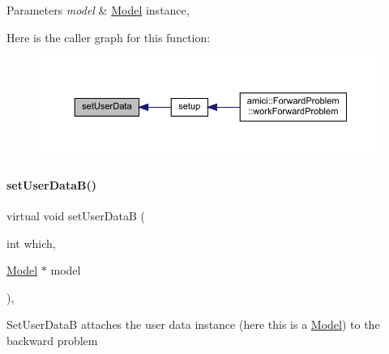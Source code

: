 \begin{DoxyParams}{Parameters}
{\em model} & \mbox{\hyperlink{classamici_1_1_model}{Model}} instance, \\
\hline
\end{DoxyParams}
Here is the caller graph for this function\+:
\nopagebreak
\begin{figure}[H]
\begin{center}
\leavevmode
\includegraphics[width=350pt]{classamici_1_1_solver_ac1ca4675503688acf946f6530fb12c10_icgraph}
\end{center}
\end{figure}
\mbox{\label{classamici_1_1_solver_ac5c347a985fa73861a88e76c7b9904f8}} 
\paragraph{\texorpdfstring{set\+User\+Data\+B()}{setUserDataB()}}
{\footnotesize\ttfamily virtual void set\+User\+DataB (\begin{DoxyParamCaption}\item[{int}]{which,  }\item[{\mbox{\hyperlink{classamici_1_1_model}{Model}} $\ast$}]{model }\end{DoxyParamCaption})\hspace{0.3cm}{\ttfamily [protected]}, {}}

Set\+User\+DataB attaches the user data instance (here this is a \mbox{\hyperlink{classamici_1_1_model}{Model}}) to the backward problem


